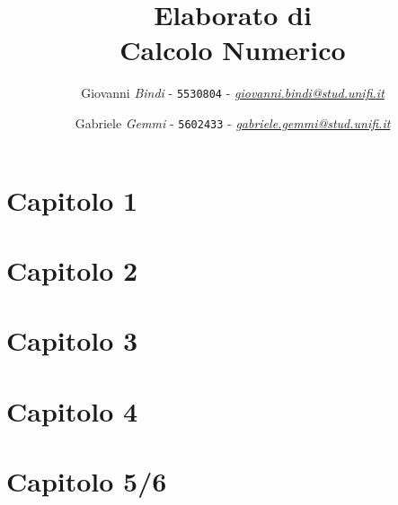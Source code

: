 \documentclass[a4paper]{article}
\begin{document}
\title{Elaborato di\\ \textbf{Calcolo Numerico}\vspace{3cm}}

\author{Giovanni \emph{Bindi} - \texttt{5530804} - \href{mailto:giovanni.bindi@stud.unifi.it}{\textit{giovanni.bindi@stud.unifi.it}}
   \and Gabriele \emph{Gemmi} - \texttt{5602433} - \href{mailto:gabriele.gemmi@stud.unifi.it}{\textit{gabriele.gemmi@stud.unifi.it}}}

\maketitle
\newpage
\tableofcontents


\newpage
\section{\textbf{Capitolo 1}}


\newpage
\section{\textbf{Capitolo 2}}


\newpage
\section{\textbf{Capitolo 3}}


\newpage
\section{\textbf{Capitolo 4}}


\newpage
\section{\textbf{Capitolo 5/6}}

\newpage
\end{document}
